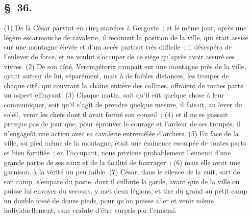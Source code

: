 \documentclass[french,twoside]{book} %
\begin{document}
\subsection[{§ 36.}]{ \textsc{§ 36.} }
\noindent (1) De là César parvint en cinq marches à Gergovie ; et le même jour, après une légère escarmouche de cavalerie, il reconnut la position de la ville, qui était assise sur une montagne élevée et d’un accès partout très difficile ; il désespéra de l’enlever de force, et ne voulut s’occuper de ce siège qu’après avoir assuré ses vivres. (2) De son côté, Vercingétorix campait sur une montagne près de la ville, ayant autour de lui, séparément, mais à de faibles distances, les troupes de chaque cité, qui couvrant la chaîne entière des collines, offraient de toutes parts un aspect effrayant. (3) Chaque matin, soit qu’il eût quelque chose à leur communiquer, soit qu’il s’agît de prendre quelque mesure, il faisait, au lever du soleil, venir les chefs dont il avait formé son conseil ; (4) et il ne se passait presque pas de jour que, pour éprouver le courage et l’ardeur de ses troupes, il n’engageât une action avec sa cavalerie entremêlée d’archers. (5) En face de la ville, au pied même de la montagne, était une éminence escarpée de toutes parts et bien fortifiée ; en l’occupant, nous privions probablement l’ennemi d’une grande partie de ses eaux et de la facilité de fourrager ; (6) mais elle avait une garnison, à la vérité un peu faible. (7) César, dans le silence de la nuit, sort de son camp, s’empare du poste, dont il culbute la garde, avant que de la ville on puisse lui envoyer du secours, y met deux légions, et tire du grand au petit camp un double fossé de douze pieds, pour qu’on puisse aller et venir même individuellement, sans crainte d’être surpris par l’ennemi.
\end{document}
